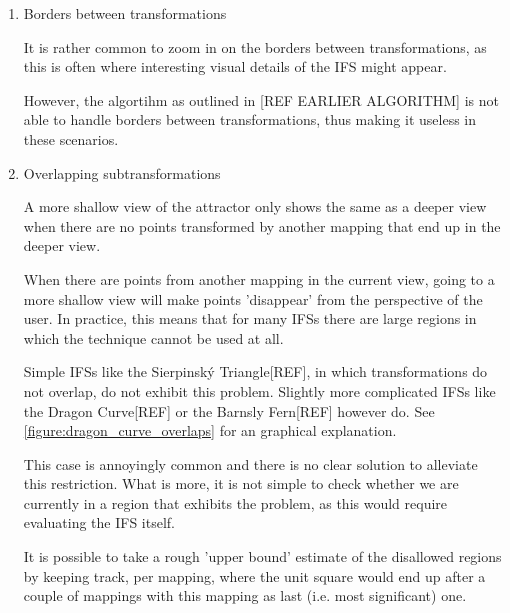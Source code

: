 \documentclass[11pt]{article}
\begin{document}
\begin{enumerate}
\item Borders between transformations
\label{sec:orgda709c9}

It is rather common to zoom in on the borders between transformations, as this is often
where interesting visual details of the IFS might appear.

However, the algortihm as outlined in [REF EARLIER ALGORITHM] is not able to handle borders between transformations,
thus making it useless in these scenarios.

\item Overlapping subtransformations
\label{sec:org4f85e5e}

A more shallow view of the attractor only shows the same as a deeper view when
there are no points transformed by another mapping that end up in the deeper view.

When there are points from another mapping in the current view, 
going to a more shallow view will make points 'disappear' from the perspective of the user.
In practice, this means that for many IFSs there are large regions in which the technique cannot be used at all.

Simple IFSs like the Sierpinský Triangle[REF], in which transformations
do not overlap, do not exhibit this problem. 
Slightly more complicated IFSs like the Dragon Curve[REF] or the Barnsly Fern[REF] however do.
See \autoref{figure:dragon_curve_overlaps} for an graphical explanation.

This case is annoyingly common and there is no clear solution to alleviate this restriction.
What is more, it is not simple to check whether we are currently in a region that exhibits the problem,
as this would require evaluating the IFS itself.

It is possible to take a rough 'upper bound' estimate of the disallowed regions by keeping track, 
per mapping, where the unit square would end up after a couple of mappings with this mapping as last (i.e. most significant) one.



\end{enumerate}
\end{document}
